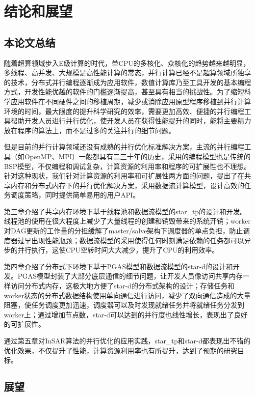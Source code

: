 
\chapter{结论和展望}
\label{chap:result6}

\section{本论文总结}

随着超算领域步入E级计算的时代，单CPU的多核化、众核化的趋势越来越明显，多线程、高并发、大规模是高性能计算的常态，并行计算已经不是超算领域所独享的技术，分布式并行编程逐渐成为应用软件，数值计算库乃至工具开发的基本编程方式，开发性能优越的软件的门槛逐渐提高，甚至具有相当的挑战性。为了缩短科学应用软件在不同硬件之间的移植周期，减少或消除应用原型程序移植到并行计算环境的时间，最大限度的提升科学研究的效率，需要更加高效、便捷的并行编程工具帮助开发人员进行并行优化，使开发人员在获得性能提升的同时，能将主要精力放在程序的算法上，而不是过多的关注并行的细节问题。

但是目前的并行计算领域还没有成熟的并行优化标准解决方案，主流的并行编程工具（如OpenMP、MPI）一般都具有二三十年的历史，采用的编程模型也是传统的BSP模型，不仅编程和调试复杂，计算资源的利用率和程序的可扩展性也不理想。针对这种现状，我们针对计算资源的利用率和可扩展性两方面的问题，提出了在共享内存和分布式内存下的并行优化解决方案，采用数据流计算模型，设计高效的任务调度策略，同时提供简单易用的用户API。

第三章介绍了共享内存环境下基于线程池和数据流模型的star\_tp的设计和开发。线程池的使用在很大程度上减少了大量线程的创建和销毁带来的系统开销；worker对DAG更新的工作量的分担缓解了master/salve架构下调度器的单点负担，防止调度器过早出现性能瓶颈；数据流模型的采用使得任何时刻满足依赖的任务都可以异步的并行执行，这使CPU空转时间大大减少，提升了CPU的利用效率。

第四章介绍了分布式下环境下基于PGAS模型和数据流模型的star-d的设计和开发。PGAS模型封装了大部分底层通信的细节问题，让开发人员像访问共享内存一样访问分布式内存，这极大地方便了star-d的分布式架构的设计；存储任务和worker状态的分布式数据结构使用单向通信进行访问，减少了双向通信造成的大量阻塞，使任务调度更加迅速，调度器可以及时发现就绪任务并将就绪任务分发到worker上；通过增加节点数，star-d可以达到的并行度也线性增长，表现出了良好的可扩展性。

通过第五章对InSAR算法的并行优化的应用实践，star\_tp和star-d都表现出不错的优化效果，不仅提升了性能，计算资源利用率也有所提升，达到了预期的研究目标。

\section{展望}

